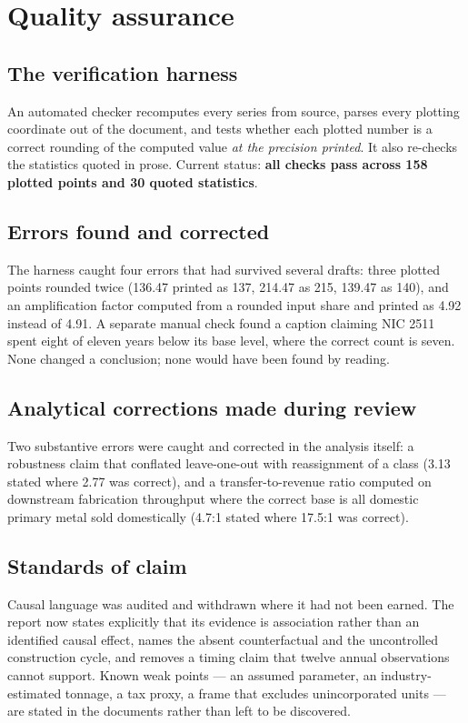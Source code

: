 \documentclass[11pt, a4paper]{article}
\begin{document}
\section{Quality assurance}

\subsection{The verification harness}

An automated checker recomputes every series from source, parses every plotting
coordinate out of the document, and tests whether each plotted number is a correct
rounding of the computed value \emph{at the precision printed}. It also re-checks the
statistics quoted in prose. Current status: \textbf{all checks pass across 158
plotted points and 30 quoted statistics}.

\subsection{Errors found and corrected}

The harness caught four errors that had survived several drafts: three plotted points
rounded twice (136.47 printed as 137, 214.47 as 215, 139.47 as 140), and an
amplification factor computed from a rounded input share and printed as 4.92 instead
of 4.91. A separate manual check found a caption claiming NIC 2511 spent eight of
eleven years below its base level, where the correct count is seven. None changed a
conclusion; none would have been found by reading.

\subsection{Analytical corrections made during review}

Two substantive errors were caught and corrected in the analysis itself: a robustness
claim that conflated leave-one-out with reassignment of a class (3.13 stated where
2.77 was correct), and a transfer-to-revenue ratio computed on downstream fabrication
throughput where the correct base is all domestic primary metal sold domestically
(4.7:1 stated where 17.5:1 was correct).

\subsection{Standards of claim}

Causal language was audited and withdrawn where it had not been earned. The report
now states explicitly that its evidence is association rather than an identified
causal effect, names the absent counterfactual and the uncontrolled construction
cycle, and removes a timing claim that twelve annual observations cannot support.
Known weak points --- an assumed parameter, an industry-estimated tonnage, a tax
proxy, a frame that excludes unincorporated units --- are stated in the documents
rather than left to be discovered.
\end{document}
